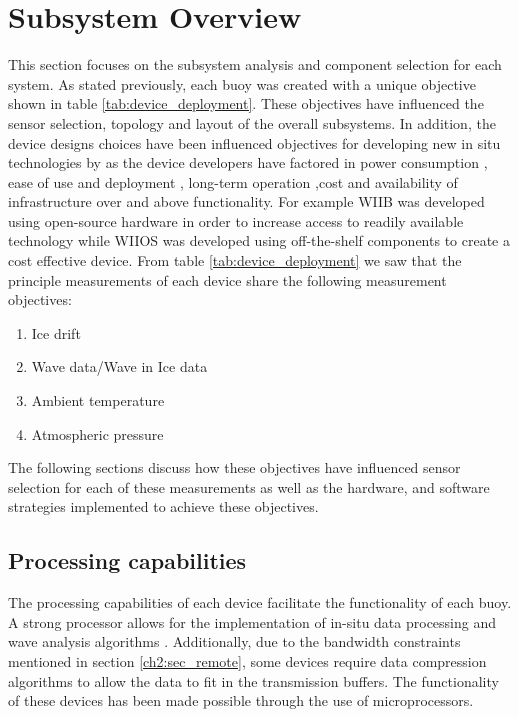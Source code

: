 \section{Subsystem Overview}

This section focuses on the subsystem analysis and component selection for each system. As stated previously, each buoy was created with a unique objective shown in table \ref{tab:device_deployment}. These objectives have influenced the sensor selection, topology and layout of the overall subsystems. In addition, the device designs choices have been influenced objectives for developing new in situ technologies by \textcite{kennicutt2016delivering} as the device developers have factored in power consumption \cite{kohout2015device}, ease of use and deployment \cite{rabault2019open}, long-term operation \cite{doble2017robust},cost \cite{planck2019evolution,rabault2019open} and availability of infrastructure \cite{doble2017robust} over and above functionality. For example WIIB was developed using open-source hardware \cite{rabault2019open} in order to increase access to readily available technology while WIIOS was developed using off-the-shelf components \cite{kohout2015device} to create a cost effective device. From table \ref{tab:device_deployment} we saw that the principle measurements of each device share the following measurement objectives:

\begin{enumerate}
	\item Ice drift
	\item Wave data/Wave in Ice data
	\item Ambient temperature
	\item Atmospheric pressure 
\end{enumerate}

The following sections discuss how these objectives have influenced sensor selection for each of these measurements as well as the hardware, and software strategies implemented to achieve these objectives.

\subsection{Processing capabilities}

The processing capabilities of each device facilitate the functionality of each buoy. A strong processor allows for the implementation of in-situ data processing and wave analysis algorithms \cite{kohout2015device,rabault2019open}. Additionally, due to the bandwidth constraints mentioned in section \ref{ch2:sec_remote}, some devices require data compression algorithms to allow the data to fit in the transmission buffers. The functionality of these devices has been made possible through the use of microprocessors.

